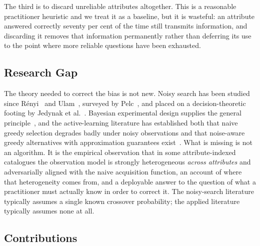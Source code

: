 The third is to discard unreliable attributes altogether. This is a reasonable
practitioner heuristic and we treat it as a baseline, but it is wasteful: an
attribute answered correctly seventy per cent of the time still transmits
information, and discarding it removes that information permanently rather
than deferring its use to the point where more reliable questions have been
exhausted.

\subsection{Research Gap}

The theory needed to correct the bias is not new. Noisy search has been
studied since R\'enyi~\cite{renyi1961} and Ulam~\cite{ulam1976}, surveyed by
Pelc~\cite{pelc2002}, and placed on a decision-theoretic footing by Jedynak et
al.~\cite{jedynak2012}. Bayesian experimental design supplies the general
principle~\cite{lindley1956,chaloner1995}, and the active-learning literature
has established both that naive greedy selection degrades badly under noisy
observations and that noise-aware greedy alternatives with approximation
guarantees exist~\cite{golovin2010noisy,golovin2011adaptive}. What is missing
is not an algorithm. It is the empirical observation that in some
attribute-indexed catalogues the observation model is strongly heterogeneous
\emph{across attributes} and adversarially aligned with the naive acquisition
function, an account of where that heterogeneity comes from, and a deployable
answer to the question of what a practitioner must actually know in order to
correct it. The noisy-search literature typically assumes a single known
crossover probability; the applied literature typically assumes none at all.

\subsection{Contributions}

